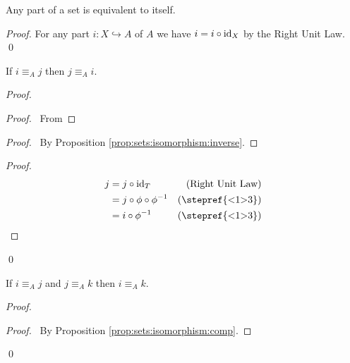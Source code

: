 \begin{prop}
 Any part of a set is equivalent to itself.
\end{prop}

\begin{proof}
 \pf
 For any part $i : X \hookrightarrow A$ of $A$ we have $i = i \circ \mathrm{id}_{X}$ by the Right Unit Law. \qed
\end{proof}

\begin{prop}
 If $i \equiv_A j$ then $j \equiv_A i$.
\end{prop}

\begin{proof}
 \pf
 \begin{proof}
   \pf\ From 
 \end{proof}
 \begin{proof}
   \pf\ By Proposition \ref{prop:sets:isomorphism:inverse}.
 \end{proof}
 \begin{proof}
   \pf
   \begin{align*}
     j & = j \circ \id{T} & (\text{Right Unit Law})\\
     & = j \circ \phi \circ \inv{\phi} & (\text{\stepref{<1>3}})\\
     & = i \circ \inv{\phi} & (\text{\stepref{<1>3}})
   \end{align*}
 \end{proof}
 \qed
\end{proof}

\begin{prop}
  If $i \equiv_A j$ and $j \equiv_A k$ then $i \equiv_A k$.
\end{prop}

\begin{proof}
  \pf
  \begin{proof}
    \pf\ By Proposition \ref{prop:sets:isomorphism:comp}.
  \end{proof}
\qed
\end{proof}

